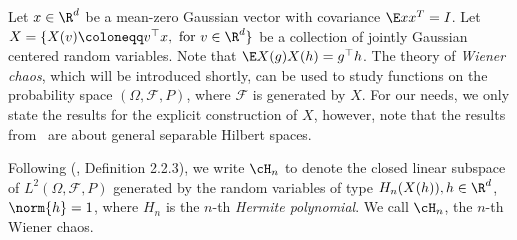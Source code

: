 Let \(x \in \R^d\) be a mean-zero Gaussian vector with covariance \(\E x x^T = I\).
Let \(X = \{X(v) \coloneqq v^{\top} x, \text{ for } v \in \R^d\}\) be a collection of jointly Gaussian centered random variables.
Note that \(\E X(g) X(h) = g^{\top} h\).
The theory of \textit{Wiener chaos}, which will be introduced shortly, 
can be used to study functions on the probability space \((\Omega, \mathcal{F}, P)\), 
where \(\mathcal{F}\) is generated by \(X\). For our needs, we only state the results for the explicit construction of \(X\), however, note that the results from~\cite{nourdin2012normal} are about general separable Hilbert spaces.

Following (\cite{nourdin2012normal}, Definition 2.2.3),
we write \(\cH_n\) to denote the closed linear subspace of \(L^2(\Omega, \mathcal{F}, P)\) 
generated by the random variables of type \(H_n(X(h)), h \in \R^d\), \(\norm{h} = 1\), where \(H_n\) is the \(n\)-th \emph{Hermite polynomial}. We call \(\cH_n\), the \(n\)-th Wiener chaos.



